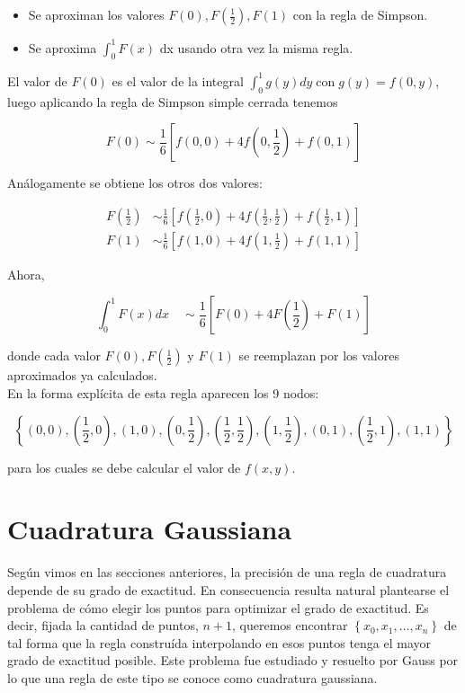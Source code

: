 \documentclass[10pt]{book}
\begin{document}
\begin{itemize}
  \item Se aproximan los valores $F(0), F\left(\frac{1}{2}\right), F(1)$ con la regla de Simpson.
  \item Se aproxima $\int_{0}^{1} F(x)$ dx usando otra vez la misma regla.
\end{itemize}

El valor de $F(0)$ es el valor de la integral $\int_{0}^{1} g(y) d y \operatorname{con} g(y)=f(0, y)$, luego aplicando la regla de Simpson simple cerrada tenemos

$$
F(0) \sim \frac{1}{6}\left[f(0,0)+4 f\left(0, \frac{1}{2}\right)+f(0,1)\right]
$$

Análogamente se obtiene los otros dos valores:

$$
\begin{aligned}
F\left(\frac{1}{2}\right) & \sim \frac{1}{6}\left[f\left(\frac{1}{2}, 0\right)+4 f\left(\frac{1}{2}, \frac{1}{2}\right)+f\left(\frac{1}{2}, 1\right)\right] \\
F(1) & \sim \frac{1}{6}\left[f(1,0)+4 f\left(1, \frac{1}{2}\right)+f(1,1)\right]
\end{aligned}
$$

Ahora,

$$
\int_{0}^{1} F(x) d x \quad \sim \frac{1}{6}\left[F(0)+4 F\left(\frac{1}{2}\right)+F(1)\right]
$$

donde cada valor $F(0), F\left(\frac{1}{2}\right)$ y $F(1)$ se reemplazan por los valores aproximados ya calculados.\\
En la forma explícita de esta regla aparecen los 9 nodos:

$$
\left\{(0,0),\left(\frac{1}{2}, 0\right),(1,0),\left(0, \frac{1}{2}\right),\left(\frac{1}{2}, \frac{1}{2}\right),\left(1, \frac{1}{2}\right),(0,1),\left(\frac{1}{2}, 1\right),(1,1)\right\}
$$

para los cuales se debe calcular el valor de $f(x, y)$.

\section{Cuadratura Gaussiana}
Según vimos en las secciones anteriores, la precisión de una regla de cuadratura depende de su grado de exactitud. En consecuencia resulta natural plantearse el problema de cómo elegir los puntos para optimizar el grado de exactitud. Es decir, fijada la cantidad de puntos, $n+1$, queremos encontrar $\left\{x_{0}, x_{1}, \ldots, x_{n}\right\}$ de tal forma que la regla construída interpolando en esos puntos tenga el mayor grado de exactitud posible. Este problema fue estudiado y resuelto por Gauss por lo que una regla de este tipo se conoce como cuadratura gaussiana.
\end{document}
